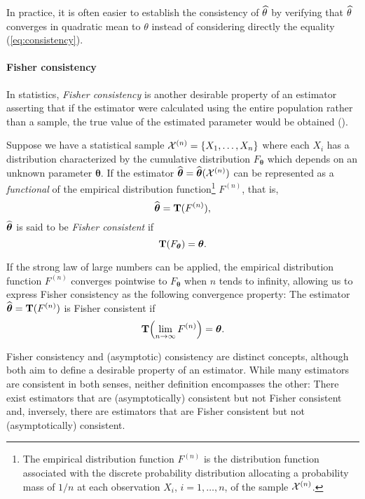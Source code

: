 In practice, it is often easier to establish the consistency of
$\widehat{\theta}$ by verifying that $\widehat{\theta}$ converges in quadratic mean
to $\theta$ instead of considering directly the equality (\ref{eq:consistency}).

\paragraph{Fisher consistency}

In statistics, \emph{Fisher consistency} is another desirable property of an
estimator asserting that if the estimator were calculated using the entire
population rather than a sample, the true value of the estimated parameter
would be obtained (\citealp{fisher:1922}).

Suppose we have a statistical sample ${\cal X}^{(n)}=\{X_1,\ldots,X_n\}$ where
each $X_i$ has a distribution characterized by the cumulative distribution
$F_{\boldsymbol\theta}$ which depends on an unknown parameter
$\boldsymbol\theta$. If the estimator
$\widehat{\boldsymbol\theta}=\widehat{\boldsymbol\theta}({\cal X}^{(n)})$ can be
represented as a \emph{functional} of the empirical distribution
function\footnote{The empirical distribution function $F^{(n)}$ is the
distribution function associated with the discrete probability distribution
allocating a probability mass of $1/n$ at each observation $X_i$,
$i=1,\ldots,n$, of the sample ${\cal X}^{(n)}$.} $F^{(n)}$, that is,
\[
    \widehat{\boldsymbol\theta}=\mathbf T(F^{(n)}),
\] 
$\widehat{\boldsymbol\theta}$ is said to be \emph{Fisher consistent} if
\[
    \mathbf T(F_{\boldsymbol\theta})=\boldsymbol\theta .
\]

If the strong law of large numbers can be applied, the empirical distribution
function $F^{(n)}$ converges pointwise to $F_{\boldsymbol\theta}$ when $n$
tends to infinity, allowing us to express Fisher consistency as the following
convergence property: The estimator
$\widehat{\boldsymbol\theta}=\mathbf T(F^{(n)})$ is Fisher consistent if
\[
    \stvec{T}\left(\lim_{n\rightarrow\infty} F^{(n)}\right)=\boldsymbol\theta .
\] 

Fisher consistency and (asymptotic) consistency are distinct concepts, although
both aim to define a desirable property of an estimator. While many estimators
are consistent in both senses, neither definition encompasses the other: There
exist estimators that are (asymptotically) consistent but not Fisher consistent
and, inversely, there are estimators that are Fisher consistent but not
(asymptotically) consistent.

